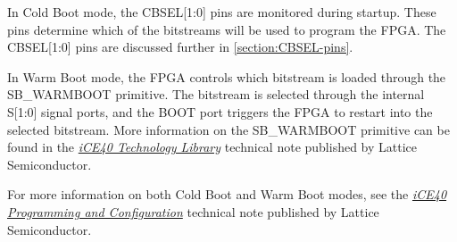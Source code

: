 In Cold Boot mode, the CBSEL[1:0] pins are monitored during startup. These pins determine which of the bitstreams will be used to program the FPGA. The CBSEL[1:0] pins are discussed further in \autoref{section:CBSEL-pins}.

In Warm Boot mode, the FPGA controls which bitstream is loaded through the SB\_WARMBOOT primitive. The bitstream is selected through the internal S[1:0] signal ports, and the BOOT port triggers the FPGA to restart into the selected bitstream. More information on the SB\_WARMBOOT primitive can be found in the \href{https://www.latticesemi.com/view_document?document_id=52206}{\textit{iCE40 Technology Library}} technical note published by Lattice Semiconductor.

For more information on both Cold Boot and Warm Boot modes, see the \href{https://www.latticesemi.com/view_document?document_id=46502}{\textit{iCE40 Programming and Configuration}} technical note published by Lattice Semiconductor.

\newpage